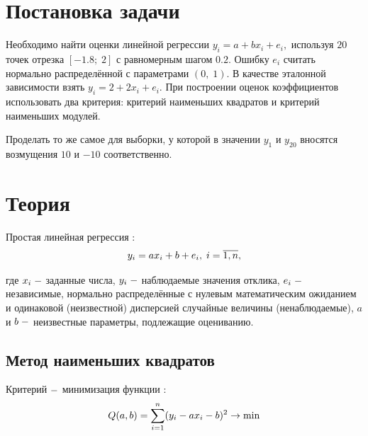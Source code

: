 \documentclass[a4]{article}
\renewcommand{\listoffigures}{\begingroup %
\tocsection
\tocfile{\listfigurename}{lof}
\endgroup}
\renewcommand{\listoftables}{\begingroup %
\tocsection
\tocfile{\listtablename}{lot}
\endgroup}
\begin{document}
\newpage
\pagestyle{plain}




\newpage
\tableofcontents{}
\newpage
\listoffigures{}
\listoftables{}
\newpage

\section{Постановка задачи}

Необходимо найти оценки линейной регрессии $y_i=a+bx_i+e_i,$ используя $20$ точек отрезка $[-1.8;\;2]$ с равномерным шагом $0.2.$ Ошибку $e_i$ считать нормально распределённой с параметрами $(0,\;1).$ В качестве эталонной зависимости взять $y_i=2+2x_i+e_i.$ При построении оценок коэффициентов использовать два критерия: критерий наименьших квадратов и критерий наименьших модулей.

Проделать то же самое для выборки, у которой в значении $y_1$ и $y_{20}$ вносятся возмущения $10$ и $-10$ соответственно.

\section{Теория}
Простая линейная регрессия \cite{lin_reg}:
\begin{equation}
    y_i=ax_i+b+e_i,\;i=\overline{1,n},\hfill
\end{equation}

где $x_i\;\--$ заданные числа, $y_i\;\--$ наблюдаемые значения отклика, $e_i\;\--$ независимые, нормально распределённые с нулевым математическим ожиданием и одинаковой (неизвестной) дисперсией случайные величины (ненаблюдаемые), $a$ и $b\;\--$ неизвестные параметры, подлежащие оцениванию.

\subsection{Метод наименьших квадратов}

Критерий $\--$ минимизация функции \cite{MNK}:
\begin{equation}
    Q(a,b)=\sum\limits_{i=1}^n(y_i-ax_i-b)^2\to \min\hfill
\end{equation}
\end{document}
